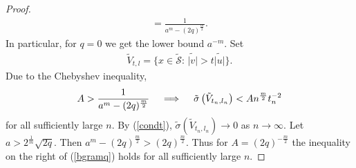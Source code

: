 \documentclass[10pt]{amsart}
\theoremstyle{remark}
\let\td=\tilde
\let\wtd=\widetilde
\begin{document}
\begin{proof}
\begin{eqnarray*}
=\frac{1}{a^m-(2q)^{\frac{m}{2}}}.
\end{eqnarray*}
In particular, for $q=0$ we get the lower bound $a^{-m}$. Set
\begin{eqnarray*}
\td V_{t,l}=\{x\in\td{\mathcal{S}}:\,\wtd{|v|}>t\wtd{|u|}\}.
\end{eqnarray*}
Due to the Chebyshev inequality,
\begin{eqnarray}\label{bgramq}
A>\frac{1}{a^m-(2q)^{\frac{m}{2}}}\kern12pt\Longrightarrow\kern12pt
\td{{\mathord{\sigma}}}\left(\td
V_{t_n,l_n}\right)<An^{\frac{m}{2}}t_n^{-2}\label{tnnmin}
\end{eqnarray}
for all sufficiently large $n$. By (\ref{condt}), $\td{{\mathord{\sigma}}}\left(\td
V_{t_n,l_n}\right)\to0$ as $n\to\infty$. Let
$a>2^{\frac1{m}}\sqrt{2q}$. Then
$a^m-(2q)^{\frac{m}{2}}>(2q)^{\frac{m}{2}}$. Thus for
$A=(2q)^{-\frac{m}{2}}$ the inequality on the right of
(\ref{bgramq}) holds for all sufficiently large $n$.


\end{proof}
\end{document}
